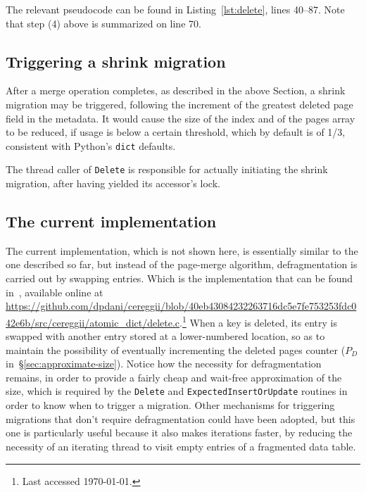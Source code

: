 The relevant pseudocode can be found in Listing~\ref{lst:delete}, lines 40--87.
Note that step (4) above is summarized on line 70.

\subsection{Triggering a shrink migration}\label{subsec:triggering-a-shrink}

After a merge operation completes, as described in the above Section, a shrink migration may be triggered, following the increment of the greatest deleted page field in the metadata.
It would cause the size of the index and of the pages array to be reduced, if usage is below a certain threshold, which by default is of 1/3, consistent with Python's \texttt{dict} defaults.

The thread caller of \texttt{Delete} is responsible for actually initiating the shrink migration, after having yielded its accessor's lock.

\subsection{The current implementation}\label{subsec:the-current-implementation}

The current implementation, which is not shown here, is essentially similar to the one described so far, but instead of the page-merge algorithm, defragmentation is carried out by swapping entries.
Which is the implementation that can be found in~\cite{cereggii}, available online at \url{https://github.com/dpdani/cereggii/blob/40eb43084232263716dc5e7fe753253fdc042e6b/src/cereggii/atomic_dict/delete.c}.\footnote{%
    Last accessed \today.
}
When a key is deleted, its entry is swapped with another entry stored at a lower-numbered location, so as to maintain the possibility of eventually incrementing the deleted pages counter ($P_D$ in~\S\ref{sec:approximate-size}).
Notice how the necessity for defragmentation remains, in order to provide a fairly cheap and wait-free approximation of the size, which is required by the \texttt{Delete} and \texttt{ExpectedInsertOrUpdate} routines in order to know when to trigger a migration.
Other mechanisms for triggering migrations that don't require defragmentation could have been adopted, but this one is particularly useful because it also makes iterations faster, by reducing the necessity of an iterating thread to visit empty entries of a fragmented data table.

